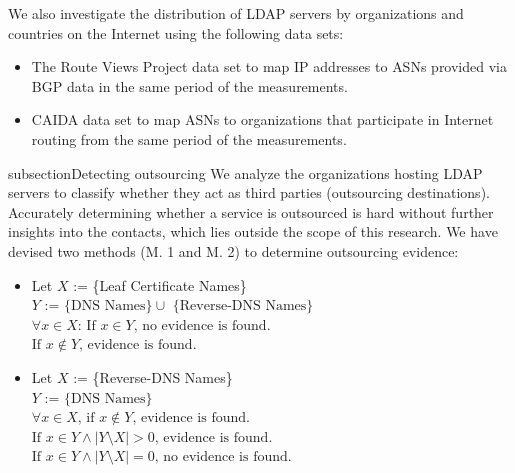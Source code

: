 We also investigate the distribution of LDAP servers by organizations and countries on the Internet using the following data sets:
\begin{itemize}
    \item[(1)] The Route Views Project data set \cite{routeviews} to map \gls{IP} addresses to \gls{ASN}s provided via \gls{BGP} data in the same period of the measurements.
    \item[(2)]  \gls{CAIDA} data set \cite{as_organizations} to map \gls{ASN}s to organizations that participate in Internet routing from the same period of the measurements.
\end{itemize}

subsection{Detecting outsourcing}
We analyze the organizations hosting LDAP servers to classify whether they act as third parties (outsourcing destinations). Accurately determining whether a service is outsourced is hard without further insights into the contacts, which lies outside the scope of this research. We have devised two methods (M. 1 and M. 2) to determine outsourcing evidence:

\begin{itemize}
\small
    \item [M1:] Let $X$ := \{Leaf Certificate Names\} \\
    $\text{$Y$ := \{DNS Names\} }\cup\text{ \{Reverse-DNS Names\}}$ \\
    $\forall x \in X \text{: If } x \in Y\text{, no evidence is found.}$\\
    $\text{If } x \notin Y\text{, evidence is found.}$

    \item [M2:] Let $X$ := \{Reverse-DNS Names\} \\
    $\text{$Y$ := \{DNS Names\}}$ \\
    $\forall x \in X \text{, if } x \notin Y\text{, evidence is found.}$\\
    $\text{If } x \in Y \land \left| Y \setminus X \right| > 0 \text{, evidence is found.}$ \\
    $\text{If }x \in Y \land \left| Y \setminus X \right| = 0 \text{, no evidence is found.}$
\end{itemize}


